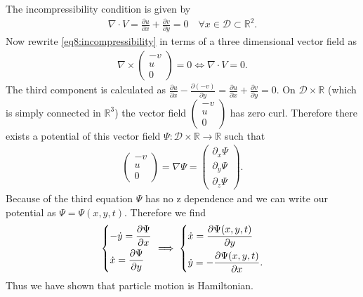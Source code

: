 \begin{ex}
The incompressibility condition is given by 
\begin{align}
	\nabla \cdot V = \frac{\partial u}{\partial x} + \frac{\partial v}{\partial y}= 0\quad \forall x\in \mathcal{D}\subset \mathbb{R}^{2}. \label{eq8:incompressibility}
\end{align}
Now rewrite \eqref{eq8:incompressibility} in terms of a three dimensional vector field as
\begin{align}
	\nabla \times 
	\begin{pmatrix}
		-v \\ u \\ 0 
	\end{pmatrix}
	=0 \Leftrightarrow
	\nabla \cdot V = 0.
\end{align}
The third component is calculated as $\frac{\partial u}{\partial x} - \frac{\partial (-v)}{\partial y} = \frac{\partial u}{\partial x} + \frac{\partial v}{\partial y} = 0$. On $\mathcal{D}\times \mathbb{R}$ (which is simply connected in $\mathbb{R}^{3}$) the vector field $
\begin{pmatrix}
	-v \\ u \\ 0
\end{pmatrix}
$ has zero curl. Therefore there exists a potential of this vector field $\Psi:\mathcal{D}\times \mathbb{R} \to \mathbb{R}$ such that
\begin{align}
\begin{pmatrix}
	-v \\ u \\ 0 
\end{pmatrix}
 = \nabla \Psi =
 \begin{pmatrix}
 	\partial_x \Psi \\ \partial_y \Psi \\ \partial_z \Psi
 \end{pmatrix}.
\end{align}
Because of the third equation $\Psi$ has no z dependence and we can write our potential as $\Psi = \Psi(x, y, t)$. Therefore we find
\begin{align}
	\begin{dcases}
		-\dot{y} = \frac{\partial \Psi}{\partial x} \\
		\dot{x} = \frac{\partial \Psi}{\partial y}
	\end{dcases}
	\implies 
	\begin{dcases}
		\dot{x} = \frac{\partial \Psi(x,y,t)}{\partial y} \\
	\dot{y} = -\frac{\partial \Psi(x,y,t)}{\partial x}.
	\end{dcases}
\end{align}
Thus we have shown that particle motion is Hamiltonian.
\end{ex}

